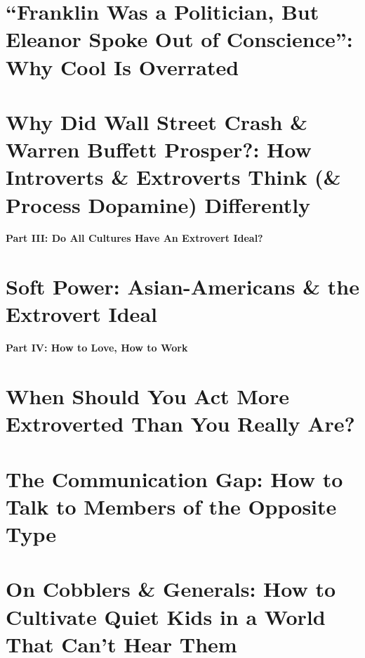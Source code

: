\documentclass{article}
\numberwithin{equation}{section}
\begin{document}
\section{``Franklin Was a Politician, But Eleanor Spoke Out of Conscience'': Why Cool Is Overrated}


\section{Why Did Wall Street Crash \& Warren Buffett Prosper?: How Introverts \& Extroverts Think (\& Process Dopamine) Differently}


\begin{center}\LARGE\sf
	\textbf{Part III: Do All Cultures Have An Extrovert Ideal?}
\end{center}

\section{Soft Power: Asian-Americans \& the Extrovert Ideal}


\begin{center}\LARGE\sf
	\textbf{Part IV: How to Love, How to Work}
\end{center}

\section{When Should You Act More Extroverted Than You Really Are?}


\section{The Communication Gap: How to Talk to Members of the Opposite Type}


\section{On Cobblers \& Generals: How to Cultivate Quiet Kids in a World That Can't Hear Them}
\end{document}
